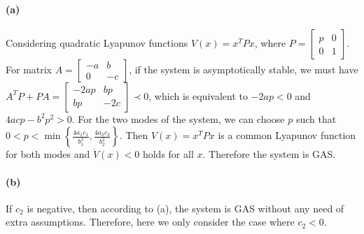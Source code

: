 \documentclass[11pt]{article}
\begin{document}
%
%
%
\paragraph{(a)} Considering quadratic Lyapunov functions $V(x) = x^T P x$, where $P = \begin{bmatrix} p & 0\\ 0 & 1\end{bmatrix}$. For matrix $A = \begin{bmatrix} -a & b\\ 0 & -c\end{bmatrix}$, if the system is asymptotically stable, we must have $A^TP + PA = \begin{bmatrix} -2ap & bp\\ bp & -2c\end{bmatrix} \prec 0$, which is equivalent to $-2ap < 0$ and $4acp - b^2p^2 > 0$. For the two modes of the system, we can choose $p$ such that $0 < p < \min\left\{\frac{4a_1c_1}{b_1^2}, \frac{4a_2c_2}{b_2^2}\right\}$. Then $V(x) = x^T P x$ is a common Lyapunov function for both modes and $\dot{V}(x) < 0$ holds for all $x$. Therefore the system is GAS.

\paragraph{(b)}
If $c_2$ is negative, then according to (a), the system is GAS without any need of extra assumptions. Therefore, here we only consider the case where $c_2 < 0$.
\end{document}
